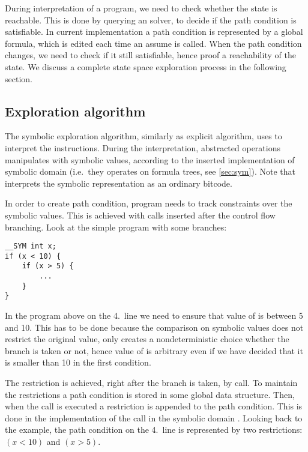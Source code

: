 During interpretation of a program, we need to check whether the state is
reachable. This is done by querying an \SMT solver, to decide if the path
condition is satisfiable. In current implementation a path condition is
represented by a global formula, which is edited each time an assume is called.
When the path condition changes, we need to check if it still satisfiable, hence
proof a reachability of the state. We discuss a complete state space
exploration process in the following section.

\subsection{Exploration algorithm}
The symbolic exploration algorithm, similarly as explicit algorithm, uses \DIVM
to interpret the \LLVM instructions. During the interpretation, abstracted
operations manipulates with symbolic values, according to the inserted implementation of
symbolic domain (i.e.~they operates on formula trees, see \autoref{sec:sym}).
Note that \DIVM interprets the symbolic representation as an ordinary \LLVM bitcode.

In order to create path condition, program needs to track constraints over the
symbolic values. This is achieved with  calls inserted after the
control flow branching. Look at the simple program with some branches:
\begin{verbatim}
__SYM int x;
if (x < 10) {
    if (x > 5) {
        ...
    }
}
\end{verbatim}
In the program above on the 4.~line we need to ensure that value of  is
between 5 and 10. This has to be done because the comparison on symbolic values
does not restrict the original value, only creates a nondeterministic choice
whether the branch is taken or not, hence value of  is arbitrary even if
we have decided that it is smaller than 10 in the first condition.

The restriction is achieved, right after the branch is taken, by
 call. To maintain the restrictions a path condition is stored in
some global data structure. Then, when the  call is executed a
restriction is appended to the path condition. This is done in the
implementation of the call  in the symbolic domain
. Looking back to
the example, the path condition on the 4.~line is represented by two
restrictions: $(x < 10)$ and $(x > 5)$.

